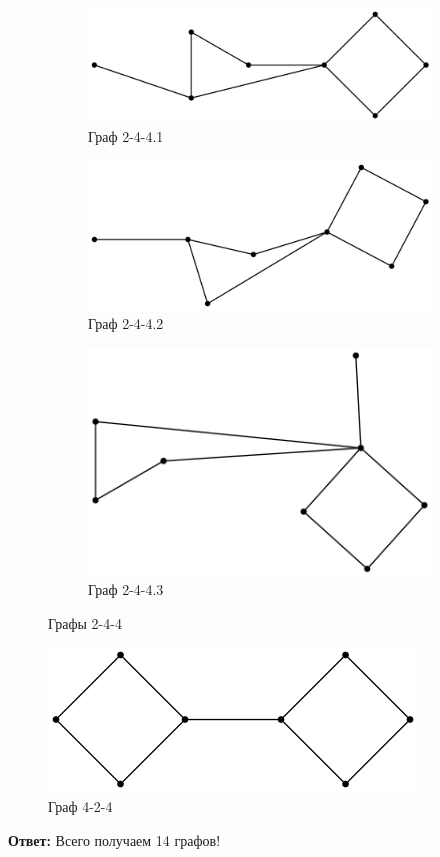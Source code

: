 \begin{solution}
\begin{figure}[H]
    \centering
    \begin{subfigure}[b]{0.45\linewidth}
        \centering
        \includegraphics[scale=0.4]{Fall/img/solution-441_244_1.dot.png}
        \caption{Граф 2-4-4.1} \label{graph 2-4-4.1}
    \end{subfigure}
    \begin{subfigure}[b]{0.45\linewidth} 
        \centering
        \includegraphics[scale=0.4]{Fall/img/solution-441_244_2.dot.png}
        \caption{Граф 2-4-4.2} \label{graph 2-4-4.2}
    \end{subfigure}
    \begin{subfigure}[b]{0.45\linewidth} 
        \centering
        \includegraphics[scale=0.4]{Fall/img/solution-441_244_3.dot.png}
        \caption{Граф 2-4-4.3} \label{graph 2-4-4.3}
    \end{subfigure}
    
    \caption{Графы 2-4-4} \label{group 2-4-4}
\end{figure}

\begin{figure}[H]
    \centering
    \includegraphics[scale=0.4]{Fall/img/solution-441_424_0.dot.png}
    \caption{Граф 4-2-4} \label{group 4-2-4}
\end{figure}

\textbf{Ответ:} Всего получаем 14 графов!

\end{solution}
